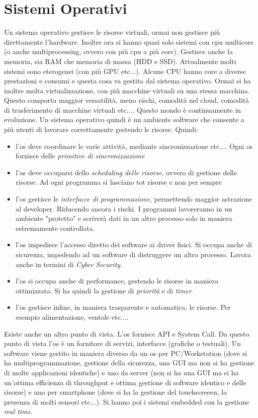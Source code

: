 \documentclass[a4paper,12pt, oneside]{book}
\begin{document}
\section{Sistemi Operativi}
Un sistema operativo gestisce le risorse virtuali, ormai non gestisce più direttamente l'hardware. Inoltre ora si hanno quasi solo sistemi con cpu multicore (o anche multiprocessing, ovvero con più cpu a più core). Gestisce anche la memoria, sia RAM che memoria di massa (HDD e SSD). Attualmente molti sistemi sono eterogenei (con più GPU etc...). Alcune CPU hanno core a diverse prestazioni e consumi e questa cosa va gestita dal sistema operativo. Ormai si ha inoltre molta virtualizzazione, con più macchine virtuali su una stessa macchina. Questo comporta maggior versatilità, meno rischi, comodità nel cloud, comodità di trasferimento di macchine virtuali etc.... Questo mondo è continuamente in evoluzione. Un sistema operativo quindi è un ambiente software che consente a più utenti di lavorare correttamente gestendo le risorse. Quindi:
\begin{itemize}
\item l'os deve coordinare le varie attività, mediante sincronizzazione etc.... Ogni os fornisce delle \textit{primitive di sincronizzazione}
\item l'os deve occuparsi dello \textit{scheduling delle risorse}, ovvero di gestione delle risorse. Ad ogni programma  si lasciano tot risorse e non per sempre
\item l'os gestisce le \textit{interfacce di programmazione}, permettendo maggior astrazione al developer. Riducendo ancora i rischi. I programmi lavoreranno in un ambiente "protetto" e scriverà dati in un altro processo solo in maniera estremamente controllata. 
\item l'os impedisce l'accesso diretto dei software ai driver fisici. Si occupa anche di sicurezza, impedendo ad un software di distruggere un altro processo. Lavora anche in termini di \textit{Cyber Security}. 
\item l'os si occupa anche di performance, gestendo le risorse in maniera ottimizzata. Si ha quindi la gestione di \textit{priorità} e di \textit{timer}
\item l'os gestisce infine, in maniera trasparente e automatica, le risorse. Per esempio alimentazione, ventole etc.... 
\end{itemize}
Esiste anche un altro punto di vista. L'os fornisce API e System Call. Da questo punto di vista l'os è un fornitore di servizi, interfacce (grafiche o testuali). Un software viene gestito in maniera diverso da un os per PC/Workstation (dove si ha multiprogrammazione, gestione della sicurezza, una GUI ma non si ha gestione di molte applicazioni identiche) e uno da server (non si ha una GUI ma si ha un'ottima efficienza di throughput e ottima gestione di software identico e delle risorse) e uno per smartphone (dove si ha la gestione del touchscreeen, la presenza di molti sensori etc...). Si hanno poi i sistemi embedded con la gestione \textit{real time}. \\
\end{document}

